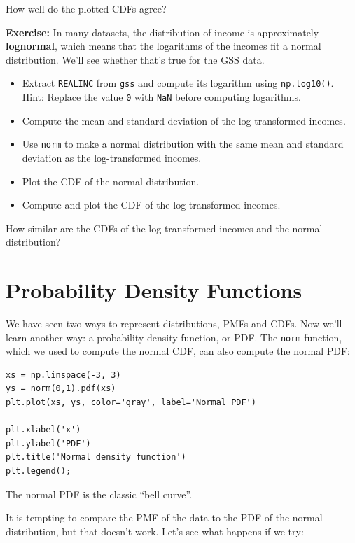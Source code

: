 How well do the plotted CDFs agree?

\textbf{Exercise:} In many datasets, the distribution of income is
approximately \textbf{lognormal}, which means that the logarithms of the
incomes fit a normal distribution. We'll see whether that's true for the
GSS data.

\begin{itemize}
\item
  Extract \passthrough{\lstinline!REALINC!} from
  \passthrough{\lstinline!gss!} and compute its logarithm using
  \passthrough{\lstinline!np.log10()!}. Hint: Replace the value
  \passthrough{\lstinline!0!} with \passthrough{\lstinline!NaN!} before
  computing logarithms.
\item
  Compute the mean and standard deviation of the log-transformed
  incomes.
\item
  Use \passthrough{\lstinline!norm!} to make a normal distribution with
  the same mean and standard deviation as the log-transformed incomes.
\item
  Plot the CDF of the normal distribution.
\item
  Compute and plot the CDF of the log-transformed incomes.
\end{itemize}

How similar are the CDFs of the log-transformed incomes and the normal
distribution?

\hypertarget{probability-density-functions}{%
\section{Probability Density
Functions}\label{probability-density-functions}}

We have seen two ways to represent distributions, PMFs and CDFs. Now
we'll learn another way: a probability density function, or PDF. The
\passthrough{\lstinline!norm!} function, which we used to compute the
normal CDF, can also compute the normal PDF:

\begin{lstlisting}[]
xs = np.linspace(-3, 3)
ys = norm(0,1).pdf(xs)
plt.plot(xs, ys, color='gray', label='Normal PDF')

plt.xlabel('x')
plt.ylabel('PDF')
plt.title('Normal density function')
plt.legend();
\end{lstlisting}

The normal PDF is the classic ``bell curve''.

It is tempting to compare the PMF of the data to the PDF of the normal
distribution, but that doesn't work. Let's see what happens if we try:

